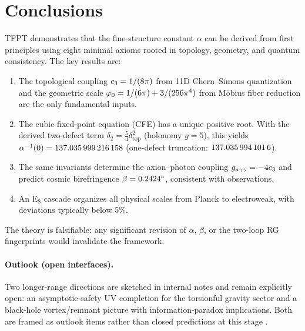 \section{Conclusions}

TFPT demonstrates that the fine-structure constant $\alpha$ can be derived 
from first principles using eight minimal axioms rooted in topology, geometry, 
and quantum consistency. The key results are:

\begin{enumerate}
    \item The topological coupling $c_3 = 1/(8\pi)$ from 11D Chern--Simons 
        quantization and the geometric scale $\varphi_0 = 1/(6\pi) + 3/(256\pi^4)$ 
        from M\"obius fiber reduction are the only fundamental inputs.
    
    \item The cubic fixed-point equation (CFE) has a unique positive root. With the derived two-defect term $\delta_2=\frac54\delta_{\mathrm{top}}^2$ (holonomy $g=5$), this yields
        $\alpha^{-1}(0)=\num[round-mode=places,round-precision=12]{\TFPTalphaInvGOverFourNum}$ (one-defect truncation: $\num[round-mode=places,round-precision=10]{\TFPTalphaInvSelfNum}$).
    
    \item The same invariants determine the axion--photon coupling 
        $g_{a\gamma\gamma} = -4c_3$ and predict cosmic birefringence 
        $\beta = \num[round-mode=places,round-precision=4]{\TFPTbetaDegNum}^\circ$, consistent with observations.
    
    \item An E$_8$ cascade organizes all physical scales from Planck to 
        electroweak, with deviations typically below 5\%.
\end{enumerate}

The theory is falsifiable: any significant revision of $\alpha$, $\beta$, 
or the two-loop RG fingerprints would invalidate the framework.

\paragraph{Outlook (open interfaces).}
Two longer-range directions are sketched in internal notes and remain explicitly open:
an asymptotic-safety UV completion for the torsionful gravity sector and a black-hole
vortex/remnant picture with information-paradox implications. Both are framed as outlook
items rather than closed predictions at this stage \cite{fiveProblemsNote2025,blackHolesBh1Note2025}.

